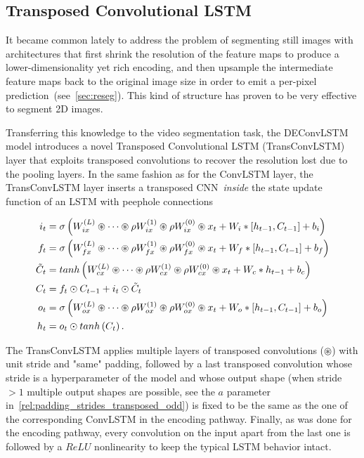 \subsection{Transposed Convolutional LSTM}

It became common lately to address the problem of segmenting still images
with architectures that first shrink the resolution of the feature maps to
produce a lower-dimensionality yet rich encoding, and then upsample the
intermediate feature maps back to the original image size in order to emit a
per-pixel prediction~(see~\autoref{sec:reseg}). This kind of structure has
proven to be very effective to segment 2D images.

Transferring this knowledge to the video segmentation task, the DEConvLSTM
model introduces a novel Transposed Convolutional LSTM (TransConvLSTM) layer
that exploits transposed convolutions to recover the resolution lost due to the
pooling layers. In the same fashion as for the ConvLSTM layer, the
TransConvLSTM layer inserts a transposed CNN~\emph{inside} the state update
function of an LSTM with peephole connections

\begin{equation}\label{eq:deconvLSTM_dec}
\begin{split}
    i_t &= \sigma\left(W_{ix}^{(L)} \circledast \dots \circledast
        \rho W_{ix}^{(1)} \circledast \rho W_{ix}^{(0)} \circledast x_t +
        W_i * \left[h_{t-1}, C_{t-1}\right] + b_i \right)\\
    f_t &= \sigma\left(W_{fx}^{(L)} \circledast \dots \circledast
        \rho W_{fx}^{(1)} \circledast \rho W_{fx}^{(0)} \circledast x_t +
        W_f * \left[h_{t-1}, C_{t-1}\right] + b_f \right)\\
    \tilde C_t &= tanh \left(W_{cx}^{(L)} \circledast \dots \circledast
        \rho W_{cx}^{(1)} \circledast \rho W_{cx}^{(0)} \circledast x_t +
        W_c * h_{t-1} + b_c \right)\\
    C_t &= f_t \odot C_{t-1} + i_t \odot \tilde C_t\\
    o_t &= \sigma\left(W_{ox}^{(L)} \circledast \dots \circledast
        \rho W_{ox}^{(1)} \circledast \rho W_{ox}^{(0)} \circledast x_t +
        W_o * \left[h_{t-1}, C_{t-1}\right] + b_o \right)\\
    h_t &= o_t \odot tanh \left(C_t\right).
\end{split}
\end{equation}

\noindent The TransConvLSTM applies multiple layers of transposed convolutions
($\circledast$) with unit stride and "same" padding, followed by a last
transposed convolution whose stride is a hyperparameter of the model and whose
output shape (when stride $> 1$ multiple output shapes are possible, see the
$a$ parameter in~\autoref{rel:padding_strides_transposed_odd}) is fixed to be
the same as the one of the corresponding ConvLSTM in the encoding pathway.
Finally, as was done for the encoding pathway, every convolution on the input
apart from the last one is followed by a $ReLU$ nonlinearity to keep the
typical LSTM behavior intact.

